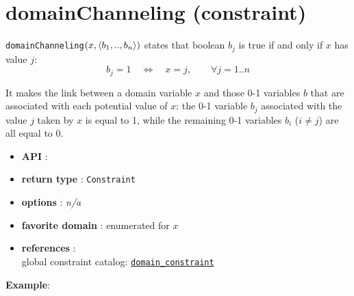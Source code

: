 \label{domainchanneling}
\hypertarget{domainchanneling}{}

\section{domainChanneling (constraint)}\label{domainchanneling:domainchannelingconstraint}\hypertarget{domainchanneling:domainchannelingconstraint}{}
\begin{notedef}  
\texttt{domainChanneling}$(x, \langle b_1,..,b_n\rangle)$ states that boolean $b_j$ is true if and only if $x$ has value $j$:
$$b_j=1\quad\iff\quad x=j,\qquad\forall j=1..n$$ 
\end{notedef}

It makes the link between a domain variable $x$ and those 0-1 variables $b$ that are associated with each potential value of $x$: the 0-1 variable $b_j$ associated with the value $j$ taken by $x$ is equal to 1, while the remaining 0-1 variables $b_i$ ($i\neq j$) are all equal to 0.

\begin{itemize}
	\item \textbf{API} : 
	\item \textbf{return type} : \texttt{Constraint}
	\item \textbf{options} : \emph{n/a}
	\item \textbf{favorite domain} : enumerated for $x$
	\item \textbf{references} :\\
	  global constraint catalog: \href{http://www.emn.fr/x-info/sdemasse/gccat/Cdomain_constraint.html}{\tt domain\_constraint}
\end{itemize}

\textbf{Example}:

